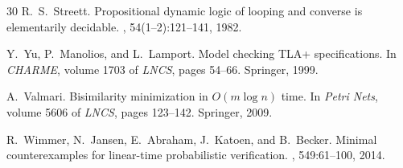 \documentclass[11pt]{article}
\begin{document}
\begin{thebibliography}{30}
R.~S.~Streett.
\newblock Propositional dynamic logic of looping and converse is elementarily
  decidable.
, 54(1--2):121--141, 1982.

Y.~Yu, P.~Manolios, and L.~Lamport.
\newblock Model checking {TLA+} specifications.
\newblock In {\em CHARME}, volume 1703 of {\em LNCS}, pages 54--66. Springer,
  1999.

A.~Valmari.
\newblock Bisimilarity minimization in $O(m \log n)$ time.
\newblock In {\em Petri Nets}, volume 5606 of {\em LNCS}, pages 123--142.
  Springer, 2009.

R.~Wimmer, N.~Jansen, E.~Abraham, J.~Katoen, and B.~Becker.
\newblock Minimal counterexamples for linear-time probabilistic verification.
, 549:61--100, 2014.

\end{thebibliography}
\end{document}
